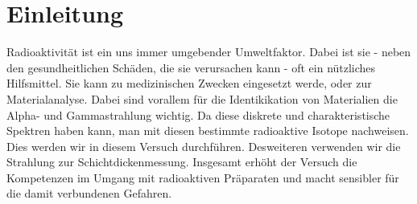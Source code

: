 

\chapter{Einleitung}
\label{chap:einleitung}

Radioaktivität ist ein uns immer umgebender Umweltfaktor. Dabei ist sie - neben den gesundheitlichen Schäden, die sie verursachen 
kann - oft ein nützliches Hilfsmittel. Sie kann zu medizinischen Zwecken eingesetzt werde, oder zur Materialanalyse. 
Dabei sind vorallem für die Identikikation von Materialien die Alpha- und Gammastrahlung wichtig. Da diese diskrete und charakteristische 
Spektren haben kann, man mit diesen bestimmte radioaktive Isotope nachweisen. Dies werden wir in diesem Versuch durchführen. Desweiteren 
verwenden wir die Strahlung zur Schichtdickenmessung. Insgesamt erhöht der Versuch die Kompetenzen im Umgang mit radioaktiven Präparaten und 
macht sensibler für die damit verbundenen Gefahren.
